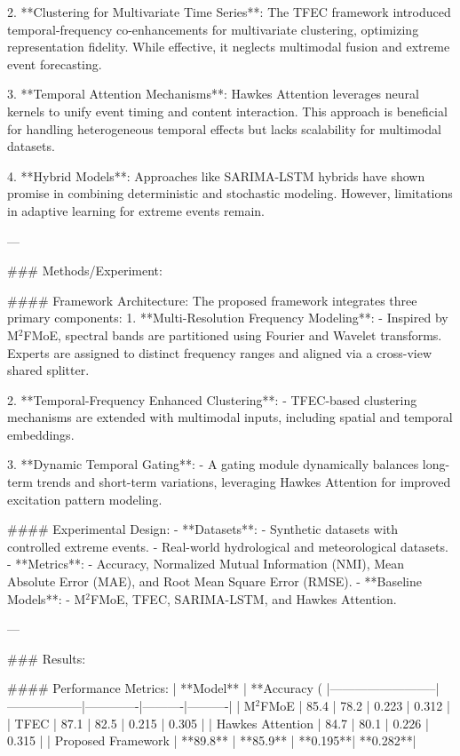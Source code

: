 2. **Clustering for Multivariate Time Series**: The TFEC framework introduced temporal-frequency co-enhancements for multivariate clustering, optimizing representation fidelity. While effective, it neglects multimodal fusion and extreme event forecasting.

3. **Temporal Attention Mechanisms**: Hawkes Attention leverages neural kernels to unify event timing and content interaction. This approach is beneficial for handling heterogeneous temporal effects but lacks scalability for multimodal datasets.

4. **Hybrid Models**: Approaches like SARIMA-LSTM hybrids have shown promise in combining deterministic and stochastic modeling. However, limitations in adaptive learning for extreme events remain.

---

### Methods/Experiment:

#### Framework Architecture:
The proposed framework integrates three primary components:
1. **Multi-Resolution Frequency Modeling**:
   - Inspired by M$^2$FMoE, spectral bands are partitioned using Fourier and Wavelet transforms. Experts are assigned to distinct frequency ranges and aligned via a cross-view shared splitter.

2. **Temporal-Frequency Enhanced Clustering**:
   - TFEC-based clustering mechanisms are extended with multimodal inputs, including spatial and temporal embeddings.

3. **Dynamic Temporal Gating**:
   - A gating module dynamically balances long-term trends and short-term variations, leveraging Hawkes Attention for improved excitation pattern modeling.

#### Experimental Design:
- **Datasets**:
  - Synthetic datasets with controlled extreme events.
  - Real-world hydrological and meteorological datasets.
- **Metrics**:
  - Accuracy, Normalized Mutual Information (NMI), Mean Absolute Error (MAE), and Root Mean Square Error (RMSE).
- **Baseline Models**:
  - M$^2$FMoE, TFEC, SARIMA-LSTM, and Hawkes Attention.

---

### Results:

#### Performance Metrics:
| **Model**                | **Accuracy (%
|--------------------------|------------------|-------------|----------|----------|
| M$^2$FMoE               | 85.4             | 78.2        | 0.223    | 0.312    |
| TFEC                    | 87.1             | 82.5        | 0.215    | 0.305    |
| Hawkes Attention         | 84.7             | 80.1        | 0.226    | 0.315    |
| Proposed Framework       | **89.8**         | **85.9**    | **0.195**| **0.282**|

